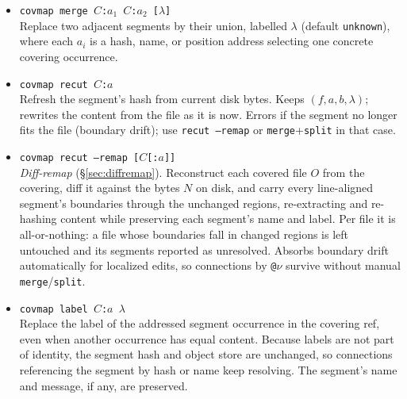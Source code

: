 \documentclass[11pt,a4paper]{article}
\begin{document}
\begin{itemize}[leftmargin=2em,itemsep=2pt]
      Every fragment created from an actually subdivided segment receives
      label \texttt{unknown}. The first fragment retains the original name
      and message; later fragments are anonymous and un-messaged. Slicing
      uses stored object content, and the fragments concatenate exactly to
      the original. Discoverable local name endpoints keep resolving but
      narrow to the first fragment; local hash endpoints to the original
      become broken. The command reports both effects and the inability to
      discover inbound refs stored in another repository.
\item \texttt{covmap merge $C$:$a_1$ $C$:$a_2$ [$\lambda$]}\\
      Replace two adjacent segments by their union, labelled
      $\lambda$ (default \texttt{unknown}), where each $a_i$ is a hash,
      name, or position address selecting one concrete covering occurrence.
\item \texttt{covmap recut $C$:$a$}\\
      Refresh the segment's hash from current disk bytes. Keeps
      $(f, a, b, \lambda)$; rewrites the content from the file as it
      is now. Errors if the segment no longer fits the file (boundary
      drift); use \texttt{recut --remap} or \texttt{merge}+\texttt{split}
      in that case.
\item \texttt{covmap recut --remap [$C$[:$a$]]}\\
      \emph{Diff-remap} (\S\ref{sec:diffremap}). Reconstruct each
      covered file $O$ from the covering, diff it against the bytes $N$
      on disk, and carry every line-aligned segment's boundaries through
      the unchanged regions, re-extracting and re-hashing content while
      preserving each segment's name and label. Per file it is
      all-or-nothing: a file whose boundaries fall in changed regions is
      left untouched and its segments reported as unresolved. Absorbs
      boundary drift automatically for localized edits, so connections
      by \texttt{@$\nu$} survive without manual \texttt{merge}/\texttt{split}.
\item \texttt{covmap label $C$:$a$ $\lambda$}\\
      Replace the label of the addressed segment occurrence in the covering
      ref, even when another occurrence has equal content. Because labels
      are not part of identity, the segment hash and object store are
      unchanged, so connections referencing the segment by hash or name
      keep resolving. The segment's name and message, if any, are preserved.

\end{itemize}
\end{document}
